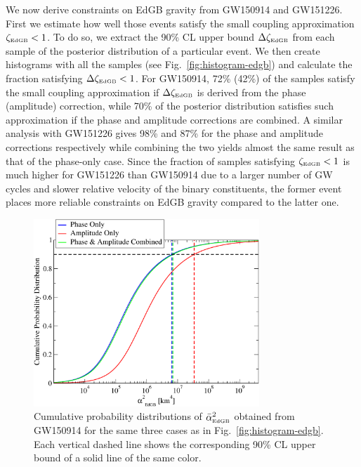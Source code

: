 \documentclass[prd,twocolumn,nofootinbib]{revtex4-1}
\newcommand{\EDGB}{{\mbox{\tiny EdGB}}}
\begin{document}
We now derive constraints on EdGB gravity from GW150914 and GW151226. First we estimate how well those events satisfy the small coupling approximation $\zeta_{\EDGB}<1$. To do so, we extract the 90\% CL upper bound $\Delta\zeta_{\EDGB}$ from each sample of the posterior distribution of a particular event. We then create histograms with all the samples (see Fig.~\ref{fig:histogram-edgb}) and calculate the fraction satisfying $\Delta\zeta_{\EDGB}<1$.  For GW150914, 72\% (42\%) of the samples satisfy the small coupling approximation if $\Delta\zeta_{\EDGB}$ is derived from the phase (amplitude) correction, while 70\% of the posterior distribution satisfies such approximation if the phase and amplitude corrections are combined. A similar analysis with GW151226 gives 98\% and 87\% for the phase and amplitude corrections respectively while combining the two yields almost the same result as that of the phase-only case. Since the fraction of samples satisfying $\zeta_{\EDGB}<1$ is much higher for GW151226 than GW150914 due to a larger number of GW cycles and slower relative velocity of the binary constituents, the former event places more reliable constraints on EdGB gravity compared to the latter one.


\begin{figure}[htb]
\includegraphics[width=8.5cm]{edgb-gw150914.pdf}
\caption{Cumulative probability distributions of $\bar{\alpha}^2_{\EDGB}$ obtained from GW150914 for the same three cases as in Fig.~\ref{fig:histogram-edgb}. Each vertical dashed line shows the corresponding 90\% CL upper bound of a solid line of the same color.}
\label{fig:pdf-edgb}
\end{figure}
\end{document}
